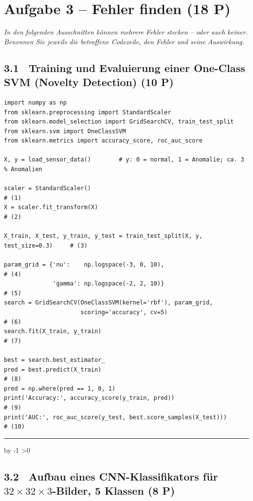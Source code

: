 \documentclass[10pt,a4paper]{article}
\newcommand{\antwortlinien}[1]{%
  \par\vspace{2pt}%
  \newcount\zeilen \zeilen=#1
  \loop
    \noindent\rule{\linewidth}{0.4pt}\par\vspace{11pt}%
    \advance\zeilen by -1
  \ifnum\zeilen>0 \repeat
}
\newcommand{\pkt}[1]{\hfill\textbf{(#1 P)}}
\begin{document}
\newpage
\section*{Aufgabe 3 -- Fehler finden \pkt{18}}

\emph{In den folgenden Ausschnitten können mehrere Fehler stecken -- oder auch keiner.
Benennen Sie jeweils die betroffene Codezeile, den Fehler und seine Auswirkung.}

\subsection*{3.1 \ Training und Evaluierung einer One-Class SVM (Novelty Detection) \pkt{10}}

\begin{lstlisting}
import numpy as np
from sklearn.preprocessing import StandardScaler
from sklearn.model_selection import GridSearchCV, train_test_split
from sklearn.svm import OneClassSVM
from sklearn.metrics import accuracy_score, roc_auc_score

X, y = load_sensor_data()        # y: 0 = normal, 1 = Anomalie; ca. 3 % Anomalien

scaler = StandardScaler()                                                    # (1)
X = scaler.fit_transform(X)                                                  # (2)

X_train, X_test, y_train, y_test = train_test_split(X, y, test_size=0.3)     # (3)

param_grid = {'nu':    np.logspace(-3, 0, 10),                               # (4)
              'gamma': np.logspace(-2, 2, 10)}                               # (5)
search = GridSearchCV(OneClassSVM(kernel='rbf'), param_grid,
                      scoring='accuracy', cv=5)                              # (6)
search.fit(X_train, y_train)                                                 # (7)

best = search.best_estimator_
pred = best.predict(X_train)                                                 # (8)
pred = np.where(pred == 1, 0, 1)
print('Accuracy:', accuracy_score(y_train, pred))                            # (9)
print('AUC:', roc_auc_score(y_test, best.score_samples(X_test)))             # (10)
\end{lstlisting}

\antwortlinien{10}

\newpage
\subsection*{3.2 \ Aufbau eines CNN-Klassifikators für $32\times32\times3$-Bilder, 5 Klassen \pkt{8}}
\end{document}

